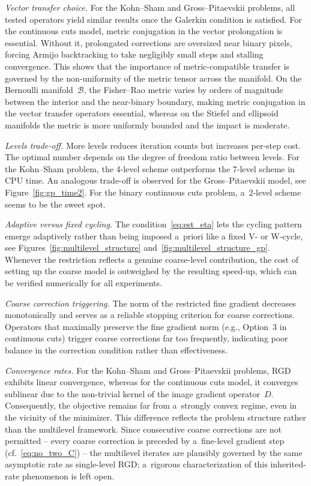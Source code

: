 \documentclass[11pt,reqno]{amsart}
\theoremstyle{plain}
\newcommand\calB{\mathcal B}
\begin{document}
		\textit{Vector transfer choice.} For the Kohn--Sham and Gross--Pitaevskii problems, all tested operators yield similar results once the Galerkin condition is satisfied. For the continuous cuts model, metric conjugation in the vector prolongation is essential. Without it, prolongated corrections are oversized near binary pixels, forcing Armijo backtracking to take negligibly small steps and stalling convergence. This shows that the importance of metric-compatible transfer is governed by the non-uniformity of the metric tensor across the manifold. On the Bernoulli manifold~$\calB$, the Fisher--Rao metric varies by orders of magnitude between the interior and the near-binary boundary, making metric conjugation in the vector transfer operators essential, whereas 
		on the Stiefel and ellipsoid manifolds the metric is more uniformly 
		bounded and the impact is moderate.
		
		\textit{Levels trade-off.} More levels reduces iteration counts but increases per-step cost. The optimal number depends on the degree of freedom ratio between levels. For the Kohn--Sham problem, the 4-level scheme outperforms the 7-level scheme in CPU time. An analogous trade-off is observed for the Gross--Pitaevskii model, see Figure~\ref{fig:gp_time2}. For the binary continuous cuts problem, a~2-level scheme seems to be the sweet spot.
		
		\textit{Adaptive versus fixed cycling.} The condition~\eqref{eq:est_eta} lets the cycling pattern emerge adaptively rather than being imposed a~priori like a fixed V- or W-cycle, see Figures~\ref{fig:multilevel_structure} and~\ref{fig:multilevel_structure_gp}. Whenever the restriction reflects a genuine coarse-level contribution, the cost of setting up the coarse model is outweighed by the resulting speed-up, which can be verified numerically for all experiments.
		
		\textit{Coarse correction triggering.} The norm of the restricted fine gradient decreases monotonically and serves as a reliable stopping criterion for coarse corrections. Operators that maximally preserve the fine gradient norm (e.g., Option~3 in continuous cuts) trigger coarse corrections far too frequently, indicating poor balance in the correction condition rather than effectiveness.
		
		\textit{Convergence rates.} For the Kohn--Sham and Gross--Pitaevskii problems, RGD exhibits linear convergence, whereas for the continuous cuts model, it converges  sublinear due to the non-trivial kernel of the image gradient operator~$D$. Consequently, the objective remains far from a~strongly convex regime, even in the vicinity of the minimizer. This difference reflects the problem structure rather than the multilevel framework. Since consecutive coarse corrections are not permitted -- every coarse correction is preceded by a~fine-level gradient step (cf.~\eqref{eq:no_two_C}) -- the multilevel iterates are plausibly governed by the same asymptotic rate as single-level RGD; a~rigorous characterization of this inherited-rate phenomenon is left open.
		
\end{document}
